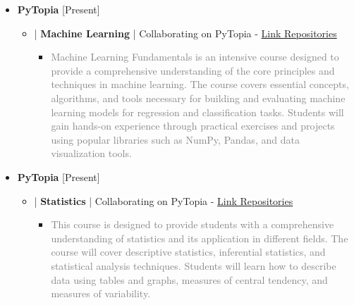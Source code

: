 \documentclass[10pt,a4paper,sans]{moderncv} %
\begin{document}
             \begin{itemize}
		\item {} \textbf{PyTopia } \hfill[Present]   
		\vspace{0.5em}

      \begin{itemize}
       \item{} | \textbf{Machine Learning} | Collaborating on PyTopia - \href{https://github.com/pytopia/Python-2023}{Link Repositories}
        
		\begin{itemize}
			\item \textcolor{gray}{Machine Learning Fundamentals is an intensive course designed to provide a comprehensive understanding of the core principles and techniques in machine learning. The course covers essential concepts, algorithms, and tools necessary for building and evaluating machine learning models for regression and classification tasks. Students will gain hands-on experience through practical exercises and projects using popular libraries such as NumPy, Pandas, and data visualization tools.}


   

			\end{itemize}	
				
		\end{itemize}
  
		\end{itemize}


               \begin{itemize}
		\item {} \textbf{PyTopia }   \hfill[Present]  
		\vspace{0.5em}

      \begin{itemize}
       \item{} | \textbf{Statistics} | Collaborating on PyTopia  - \href{https://github.com/pytopia/Python-2023}{Link Repositories} 
        
		\begin{itemize}
			\item \textcolor{gray}{This course is designed to provide students with a comprehensive understanding of statistics and its application in different fields. The course will cover descriptive statistics, inferential statistics, and statistical analysis techniques. Students will learn how to describe data using tables and graphs, measures of central tendency, and measures of variability.}
			\end{itemize}	
				
		\end{itemize}
  
		\end{itemize}
\end{document}
